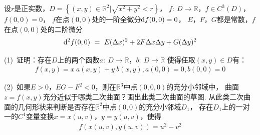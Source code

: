 \begin{example}[2022 A卷]
\label{ex:ch06-22}
设$r$是正实数，$D = \left\{ (x,y)\in \mathbb{R}^2 | \sqrt{x^2 + y^2} < r \right\}$，
$f: ~D \to \mathbb{R}$，$f \in C^3(D)$，$f(0,0)=0$，
$f$在点$(0,0)$处的一阶全微分$\mathrm{d} f(0,0) = 0$，
$E$，$F$，$G$都是常数，$f$在点$(0,0)$处的二阶微分
\begin{equation}
    \begin{aligned}
        \mathrm{d}^2 f(0,0) ~=~ E(\Delta x)^2 + 2F \Delta x \Delta y + G (\Delta y)^2
        \nonumber
    \end{aligned}
\end{equation}

(1)~证明：存在$D$上的两个函数$a:~D\to \mathbb{R}$，$b:~D\to \mathbb{R}$
使得任取$(x,y) \in D$有：
\begin{equation}
    \begin{aligned}
        f(x,y) = x~a(x,y) + y~ b(x,y),a(0,0)=0,b(0,0)=0
        \nonumber
    \end{aligned}
\end{equation}

(2)~如果$E>0$，$EG-F^2<0$，则在$\mathbb{R}^3$中点$(0,0,0)$的充分小邻域中，
曲面$z = f(x,y)$充分近似于哪类二次曲面？画出此类二次曲面的草图.
从此类二次曲面的几何形状来判断是否存在$\mathbb{R}^2$中点$(0,0)$的充分小邻域$D_1$，
存在$D_1$上的一对一的$C^1$变量变换$x = x(u,v)$，$y = y(u,v)$，使得
\begin{equation}
    \begin{aligned}
        f(x(u,v),y(u,v)) = u^2 - v^2
        \nonumber
    \end{aligned}
\end{equation}
\end{example}

